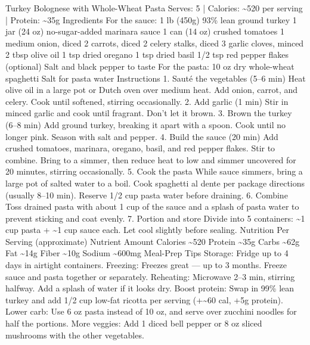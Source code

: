 Turkey Bolognese with Whole-Wheat Pasta Serves: 5 | Calories: \~{}520 per serving | Protein: \~{}35g Ingredients For the sauce: 1 lb (450g) 93\% lean ground turkey 1 jar (24 oz) no-sugar-added marinara sauce 1 can (14 oz) crushed tomatoes 1 medium onion, diced 2 carrots, diced 2 celery stalks, diced 3 garlic cloves, minced 2 tbsp olive oil 1 tsp dried oregano 1 tsp dried basil 1/2 tsp red pepper flakes (optional) Salt and black pepper to taste For the pasta: 10 oz dry whole-wheat spaghetti Salt for pasta water Instructions 1. Sauté the vegetables (5–6 min) Heat olive oil in a large pot or Dutch oven over medium heat. Add onion, carrot, and celery. Cook until softened, stirring occasionally. 2. Add garlic (1 min) Stir in minced garlic and cook until fragrant. Don't let it brown. 3. Brown the turkey (6–8 min) Add ground turkey, breaking it apart with a spoon. Cook until no longer pink. Season with salt and pepper. 4. Build the sauce (20 min) Add crushed tomatoes, marinara, oregano, basil, and red pepper flakes. Stir to combine. Bring to a simmer, then reduce heat to low and simmer uncovered for 20 minutes, stirring occasionally. 5. Cook the pasta While sauce simmers, bring a large pot of salted water to a boil. Cook spaghetti al dente per package directions (usually 8–10 min). Reserve 1/2 cup pasta water before draining. 6. Combine Toss drained pasta with about 1 cup of the sauce and a splash of pasta water to prevent sticking and coat evenly. 7. Portion and store Divide into 5 containers: \~{}1 cup pasta + \~{}1 cup sauce each. Let cool slightly before sealing. Nutrition Per Serving (approximate) Nutrient Amount Calories \~{}520 Protein \~{}35g Carbs \~{}62g Fat \~{}14g Fiber \~{}10g Sodium \~{}600mg Meal-Prep Tips Storage: Fridge up to 4 days in airtight containers. Freezing: Freezes great — up to 3 months. Freeze sauce and pasta together or separately. Reheating: Microwave 2–3 min, stirring halfway. Add a splash of water if it looks dry. Boost protein: Swap in 99\% lean turkey and add 1/2 cup low-fat ricotta per serving (+\~{}60 cal, +5g protein). Lower carb: Use 6 oz pasta instead of 10 oz, and serve over zucchini noodles for half the portions. More veggies: Add 1 diced bell pepper or 8 oz sliced mushrooms with the other vegetables.
\par

